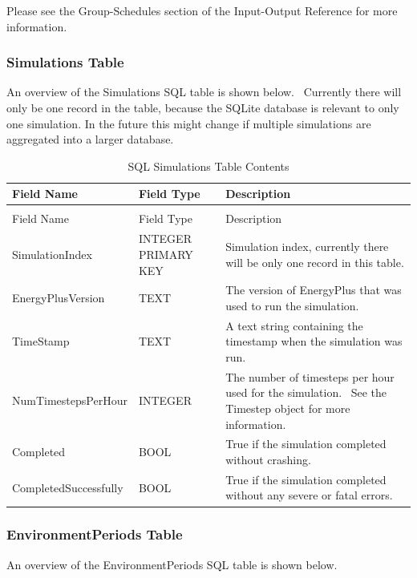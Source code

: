 Please see the Group-Schedules section of the Input-Output Reference for more information.

\subsubsection{Simulations Table}

An overview of the Simulations SQL table is shown below.  Currently there will only be one record in the table, because the SQLite database is relevant to only one simulation. In the future this might change if multiple simulations are aggregated into a larger database.

\begin{longtable}[c]{>{\raggedright}p{1.5in}>{\raggedright}p{1.5in}>{\raggedright}p{3.0in}}
\caption{SQL Simulations Table Contents \label{table:table-36.-sql-simulations-table-contents}} \tabularnewline
\toprule
Field Name & Field Type & Description \tabularnewline
\midrule
\endfirsthead

\caption[]{SQL Simulations Table Contents} \tabularnewline
\toprule
Field Name & Field Type & Description \tabularnewline
\midrule
\endhead

SimulationIndex & INTEGER PRIMARY KEY & Simulation index, currently there will be only one record in this table. \tabularnewline
EnergyPlus\-Version & TEXT & The version of EnergyPlus that was used to run the simulation. \tabularnewline
TimeStamp & TEXT & A text string containing the timestamp when the simulation was run. \tabularnewline
NumTimesteps\-Per\-Hour & INTEGER & The number of timesteps per hour used for the simulation.~ See the Timestep object for more information. \tabularnewline
Completed & BOOL & True if the simulation completed without crashing. \tabularnewline
Completed\-Successfully & BOOL & True if the simulation completed without any severe or fatal errors. \tabularnewline
\bottomrule
\end{longtable}

\subsubsection{EnvironmentPeriods Table}

An overview of the EnvironmentPeriods SQL table is shown below.


